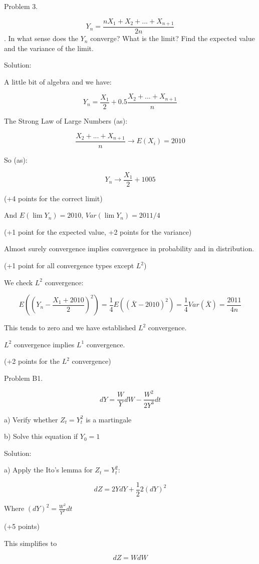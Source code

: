\documentclass[pdftex,12pt,a4paper]{article}
\begin{document}
Problem 3. 

\[ Y_{n}=\frac{nX_{1}+X_{2}+...+X_{n+1}}{2n} \]. In what sense does the $ Y_{n} $ converge? What is the limit? Find the expected value and the variance of the limit.

Solution:

A little bit of algebra and we have:

\[ Y_{n}=\frac{X_{1}}{2}+0.5\frac{X_{2}+...+X_{n+1}}{n} \]

The Strong Law of Large Numbers (as):

\[ \frac{X_{2}+...+X_{n+1}}{n} \to E(X_{i})=2010 \]

So (as):

\[ Y_{n} \to \frac{X_{1}}{2}+1005 \]

(+4 points for the correct limit)

And $ E(\lim Y_{n} )=2010$, $ Var(\lim Y_{n} )=2011/4$

(+1 point for the expected value, +2 points for the variance)

Almost surely convergence implies convergence in probability and in distribution.

(+1 point for all convergence types except $ L^{2} $)

We check $ L^{2} $ convergence:

\[E((Y_{n}-\frac{X_{1}+2010}{2})^{2})=\frac{1}{4}E((\bar{X}-2010)^{2})=\frac{1}{4}Var(\bar{X})=\frac{2011}{4n}\]

This tends to zero and we have established $ L^{2} $ convergence.

$ L^{2} $ convergence implies $ L^{1} $ convergence.

(+2 points for the $ L^{2} $ convergence)


\newpage

Problem B1.

\[ dY=\frac{W}{Y}dW-\frac{W^{2}}{2Y^{3}}dt \]

a) Verify whether $ Z_{t}=Y_{t}^{2} $ is a martingale

b) Solve this equation if $ Y_{0}=1 $

Solution:

a) Apply the Ito's lemma for $ Z_{t}=Y_{t}^{2} $:

\[ dZ=2YdY+\frac{1}{2}2(dY)^{2} \]

Where $ (dY)^{2}=\frac{W^{2}}{Y^{2}}dt $

(+5 points)

This simplifies to 

\[ dZ=WdW \]
\end{document}
